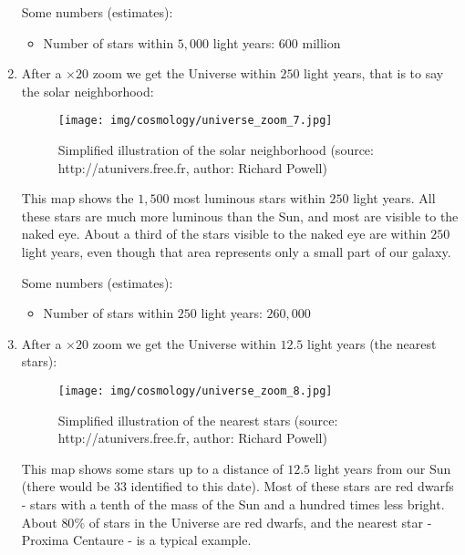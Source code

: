 \begin{enumerate}
		Some numbers (estimates):
		\begin{itemize}
			\item Number of stars within $5,000$ light years: $600$ million
		\end{itemize}
		
		\item After a $\times 20$ zoom we get the Universe within $250$ light years, that is to say the solar neighborhood:
		\begin{figure}[H]
			\centering
			\texttt{[image: img/cosmology/universe\_zoom\_7.jpg]}
			\caption[Simplified illustration of the solar neighborhood]{Simplified illustration of the solar neighborhood (source: http://atunivers.free.fr, author: Richard Powell)}
		\end{figure}
		This map shows the $1,500$ most luminous stars within $250$ light years. All these stars are much more luminous than the Sun, and most are visible to the naked eye. About a third of the stars visible to the naked eye are within $250$ light years, even though that area represents only a small part of our galaxy.
		
		Some numbers (estimates):
		\begin{itemize}
			\item Number of stars within $250$ light years: $260,000$
		\end{itemize}
		
		\item After a $\times 20$ zoom we get the Universe within $12.5$ light years (the nearest stars):
		\begin{figure}[H]
			\centering
			\texttt{[image: img/cosmology/universe\_zoom\_8.jpg]}
			\caption[Simplified illustration of the nearest stars]{Simplified illustration of the nearest stars (source: http://atunivers.free.fr, author: Richard Powell)}
		\end{figure}
		This map shows some stars up to a distance of $12.5$ light years from our Sun (there would be $33$ identified to this date). Most of these stars are red dwarfs - stars with a tenth of the mass of the Sun and a hundred times less bright. About $80\%$ of stars in the Universe are red dwarfs, and the nearest star - Proxima Centaure - is a typical example.
		

\end{enumerate}
